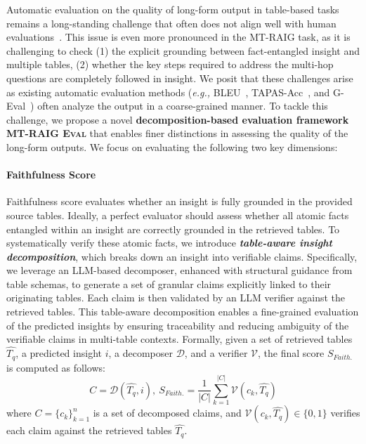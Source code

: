 Automatic evaluation on the quality of long-form output in table-based tasks remains a long-standing challenge that often does not align well with human evaluations~\citep{zhao-etal-2024-tapera,wang-etal-2024-revisiting,Seo2024UnveilingIT}.
This issue is even more pronounced in the MT-RAIG task, as it is challenging to check (1) the explicit grounding between fact-entangled insight and multiple tables, (2) whether the key steps required to address the multi-hop questions are completely followed in insight.
We posit that these challenges arise as existing automatic evaluation methods (\textit{e.g.,} BLEU~\citep{Papineni2002BleuAM}, TAPAS-Acc~\citep{Liu2022PLOGTP}, and G-Eval~\citep{Liu2023GEvalNE}) often analyze the output in a coarse-grained manner. 
To tackle this challenge, we propose a novel \textbf{decomposition-based evaluation framework} \textbf{\textsc{MT-RAIG Eval}} that enables finer distinctions in assessing the quality of the long-form outputs. 
We focus on evaluating the following two key dimensions:


\paragraph{Faithfulness Score} 
Faithfulness score evaluates whether an insight is fully grounded in the provided source tables.
Ideally, a perfect evaluator should assess whether all atomic facts entangled within an insight are correctly grounded in the retrieved tables.
To systematically verify these atomic facts, we introduce \textbf{\textit{table-aware insight decomposition}}, which breaks down an insight into verifiable claims. 
Specifically, we leverage an LLM-based decomposer, enhanced with structural guidance from table schemas, to generate a set of granular claims explicitly linked to their originating tables.
Each claim is then validated by an LLM verifier against the retrieved tables.
This table-aware decomposition enables a fine-grained evaluation of the predicted insights by ensuring traceability and reducing ambiguity of the verifiable claims in multi-table contexts.
Formally, given a set of retrieved tables $\hat{T_q}$, a predicted insight $i$,  a decomposer $\mathcal{D}$, and a verifier $\mathcal{V}$, the final score $S_{Faith.}$ is computed as follows:
\begin{equation}
    C = \mathcal{D}(\hat{T_q}, i), \ S_{Faith.}= \frac{1}{|C|} \sum_{k=1}^{|C|} \mathcal{V}(c_k, \hat{T_q})
\end{equation}
where $C = \{c_k\}_{k=1}^{n}$ is a set of decomposed claims, and $\mathcal{V}(c_k, \hat{T_q}) \in \{0, 1\}$ verifies each claim against the retrieved tables $\hat{T_q}$.

